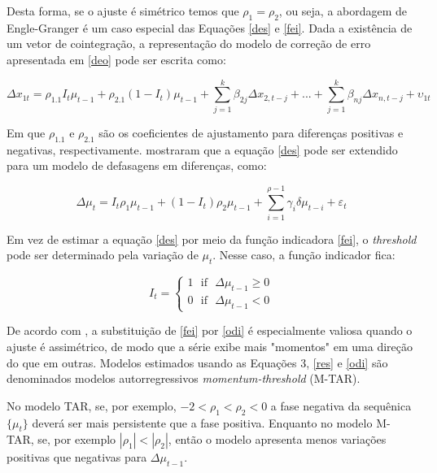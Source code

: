 \documentclass[
	article,			%
	12pt,				%
	openright,			%
	oneside,			%
	a4paper,			%
	english,			%
	brazil				%
	]{abntex2}
\begin{document}
Desta forma, se o ajuste é simétrico temos que $\rho_{1}=\rho_{2}$, ou seja,  a abordagem de Engle-Granger é um caso especial das Equações \ref{des} e \ref{fei}. Dada a existência de um vetor de cointegração, a representação do modelo de correção de erro apresentada em \ref{deo} pode ser escrita como:

\begin{equation} 
\Delta x_{1t}=\rho_{1.1}I_{t}\mu_{t-1}+\rho_{2.1}(1-I_{t})\mu_{t-1}+\sum_{j=1}^{k}\beta_{2j}\Delta x_{2,t-j}+...+\sum_{j=1}^{k}\beta_{nj}\Delta x_{n,t-j}+\upsilon_{1t}
\end{equation}

Em que $\rho_{1.1}$ e $\rho_{2.1}$ são os coeficientes de ajustamento para diferenças positivas e negativas, respectivamente.  mostraram que a equação \ref{des} pode ser extendido para um modelo de defasagens em diferenças, como:

\begin{equation} \label{fea}
\Delta \mu_{t}=I_{t}\rho_{1}\mu_{t-1} +\left ( 1-I_{t} \right )\rho_{2}\mu_{t-1}+\sum_{i=1}^{\rho-1}\gamma_{i}\delta \mu_{t-i} +\varepsilon_{t}
\end{equation}

Em vez de estimar a equação \ref{des} por meio da função indicadora \ref{fei}, o \textit{threshold} pode ser determinado pela variação de $\mu_{t}$. Nesse caso, a função indicador fica:

\begin{equation} \label{odi}
I_{t}=\left\{\begin{matrix}
1 \ \ \ \text{if} \ \ \ \Delta\mu_{t-1}\geq 0 \\ 
0 \ \ \ \text{if} \ \ \ \Delta\mu_{t-1}<  0
\end{matrix}\right.
\end{equation}


De acordo com , a substituição de \ref{fei} por \ref{odi} é especialmente valiosa quando o ajuste é assimétrico, de modo que a série exibe mais "momentos" em uma direção do que em outras. Modelos estimados usando as Equações 3, \ref{res} e \ref{odi} são denominados modelos autorregressivos \textit{momentum-threshold} (M-TAR).

No modelo TAR, se, por exemplo, $-2<\rho_{1}<\rho_{2}<0$ a fase negativa da sequênica $\{\mu_{t} \}$ deverá ser mais persistente que a fase positiva. Enquanto no modelo M-TAR, se, por exemplo $|\rho_{1}|<|\rho_{2}|$, então o modelo apresenta menos variações positivas que negativas para $\Delta \mu_{t-1}$.
\end{document}
